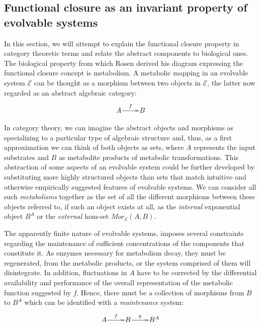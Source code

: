 \subsection*{Functional closure as an invariant property of evolvable systems}

In this section, we will attempt to explain the functional closure property in category theoretic terms and relate the abstract components to biological ones. The biological property from which Rosen derived his diagram expressing the functional closure concept is metabolism. A metabolic mapping in an evolvable system $\mathcal{E}$ can be thought as a morphism between two objects in $\mathcal{E}$, the latter now regarded as an abstract algebraic category:
$$
\xymatrix@1{
	A\ar[r]^-{f} & B
	}
$$

In category theory, we can imagine the abstract objects and morphisms as specializing to a particular type of algebraic structure and, thus, as a first approximation we can think of both objects as sets, where $A$ represents the input substrates and $B$ as metabolite products of metabolic transformations. This abstraction of some aspects of an evolvable system could be further developed by substituting more highly structured objects than sets that match intuitive and otherwise empirically suggested features of evolvable systems. We can consider all such \emph{metabolisms} together as the set of all the different morphisms between these objects referred to, if such an object exists at all, as the \emph{internal} exponential object $B^A$ or the \emph{external} hom-set $Mor_{\mathcal{E}}(A,B)$.

The apparently finite nature of evolvable systems, imposes several constraints regarding the maintenance of sufficient concentrations of the components that constitute it. As enzymes necessary for metabolism decay, they must be regenerated, from the metabolic products, or the system comprised of them will disintegrate. In addition, fluctuations in $A$ have to be corrected by the differential availability and performance of the overall representation of the metabolic function suggested by $f$. Hence, there must be a collection of morphisms from $B$ to $B^A$ which can be identified with a \emph{maintenance} system:
$$
	\xymatrix@1{
	A\ar[r]^f &B\ar[r]^-g & B^A}
$$

